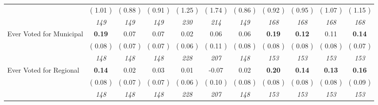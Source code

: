 \begin{tabular}{l c c c c c c c c c c}
& (     1.01 ) & (     0.88 ) & (     0.91 ) & (     1.25 ) & (     1.74 ) & (     0.86 ) & (     0.92 ) & (     0.95 ) & (     1.07 ) & (     1.15 ) \\
& \textit{ 149 } & \textit{ 149 } & \textit{ 149 } & \textit{ 230 } & \textit{ 214 } & \textit{ 149 } & \textit{ 168 } & \textit{ 168 } & \textit{ 168 } & \textit{ 168 } \\
Ever Voted for Municipal & \textbf{      0.19 } &      0.07 &      0.07 &      0.02 &      0.06 &      0.06 & \textbf{      0.19 } & \textbf{      0.12 } &      0.11 & \textbf{     0.14} \\
& (     0.08 ) & (     0.07 ) & (     0.07 ) & (     0.06 ) & (     0.11 ) & (     0.08 ) & (     0.08 ) & (     0.08 ) & (     0.08 ) & (     0.07 ) \\
& \textit{ 148 } & \textit{ 148 } & \textit{ 148 } & \textit{ 228 } & \textit{ 207 } & \textit{ 148 } & \textit{ 153 } & \textit{ 153 } & \textit{ 153 } & \textit{ 153 } \\
Ever Voted for Regional & \textbf{      0.14 } &      0.02 &      0.03 &      0.01 &     -0.07 &      0.02 & \textbf{      0.20 } & \textbf{      0.14 } & \textbf{      0.13 } & \textbf{     0.16} \\
& (     0.08 ) & (     0.07 ) & (     0.07 ) & (     0.06 ) & (     0.10 ) & (     0.08 ) & (     0.08 ) & (     0.08 ) & (     0.08 ) & (     0.09 ) \\
& \textit{ 148 } & \textit{ 148 } & \textit{ 148 } & \textit{ 228 } & \textit{ 207 } & \textit{ 148 } & \textit{ 153 } & \textit{ 153 } & \textit{ 153 } & \textit{ 153 } \\
\bottomrule
\end{tabular}
